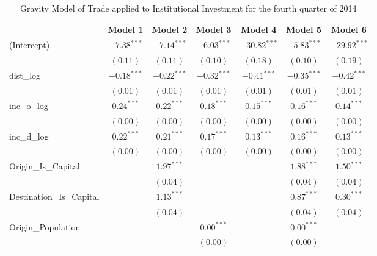 \begin{table}
	\small
	\begin{center}
		\caption[Gravity Model of trade for Q4 2014]{Gravity Model of Trade applied to Institutional Investment for the fourth quarter of 2014}
		\begin{tabular}{l c c c c c c }
			\hline
			& Model 1 & Model 2 & Model 3 & Model 4 & Model 5 & Model 6 \\
			\hline
			(Intercept)                  & $-7.38^{***}$ & $-7.14^{***}$ & $-6.03^{***}$ & $-30.82^{***}$ & $-5.83^{***}$ & $-29.92^{***}$ \\
			& $(0.11)$      & $(0.11)$      & $(0.10)$      & $(0.18)$       & $(0.10)$      & $(0.19)$       \\
			dist\_log                    & $-0.18^{***}$ & $-0.22^{***}$ & $-0.32^{***}$ & $-0.41^{***}$  & $-0.35^{***}$ & $-0.42^{***}$  \\
			& $(0.01)$      & $(0.01)$      & $(0.01)$      & $(0.01)$       & $(0.01)$      & $(0.01)$       \\
			inc\_o\_log                  & $0.24^{***}$  & $0.22^{***}$  & $0.18^{***}$  & $0.15^{***}$   & $0.16^{***}$  & $0.14^{***}$   \\
			& $(0.00)$      & $(0.00)$      & $(0.00)$      & $(0.00)$       & $(0.00)$      & $(0.00)$       \\
			inc\_d\_log                  & $0.22^{***}$  & $0.21^{***}$  & $0.17^{***}$  & $0.13^{***}$   & $0.16^{***}$  & $0.13^{***}$   \\
			& $(0.00)$      & $(0.00)$      & $(0.00)$      & $(0.00)$       & $(0.00)$      & $(0.00)$       \\
			Origin\_Is\_Capital          &               & $1.97^{***}$  &               &                & $1.88^{***}$  & $1.50^{***}$   \\
			&               & $(0.04)$      &               &                & $(0.04)$      & $(0.04)$       \\
			Destination\_Is\_Capital     &               & $1.13^{***}$  &               &                & $0.87^{***}$  & $0.30^{***}$   \\
			&               & $(0.04)$      &               &                & $(0.04)$      & $(0.04)$       \\
			Origin\_Population           &               &               & $0.00^{***}$  &                & $0.00^{***}$  &                \\
			&               &               & $(0.00)$      &                & $(0.00)$      &                \\

\end{tabular}
\end{center}
\end{table}
